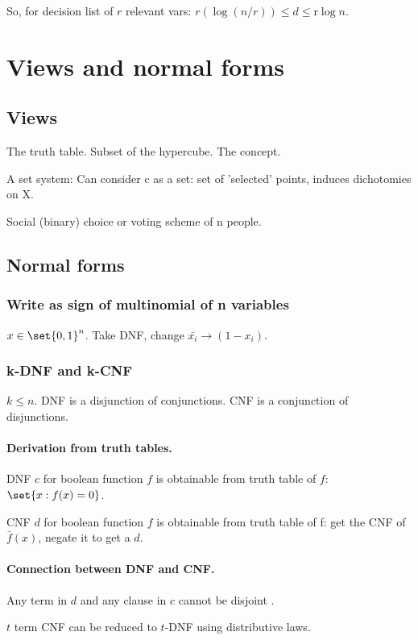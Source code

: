 \documentclass[oneside, article]{memoir}
\begin{document}
So, for decision list of $r$ relevant vars: $r(\log (n/r))\leq d \leq $r$ \log n$.

\chapter{Views and normal forms}
\section{Views}
The truth table. Subset of the hypercube. The concept.

A set system: Can consider c as a set: set of 'selected' points, induces dichotomies on X.

Social (binary) choice or voting scheme of n people.

\section{Normal forms}
\subsection{Write as sign of multinomial of n variables}
$x \in \set{0, 1}^{n}$. Take DNF, change $\bar{x_{i}} \to (1-x_{i})$.

\subsection{k-DNF and k-CNF}
$k \leq n$. DNF is a disjunction of conjunctions. CNF is a conjunction of disjunctions.

\subsubsection{Derivation from truth tables.}
DNF $c$ for boolean function $f$ is obtainable from truth table of $f$: \\$\set{x: f(x) = 0}$.

CNF $d$ for boolean function $f$ is obtainable from truth table of f: get the CNF of $\bar{f}(x)$, negate it to get a $d$.

\subsubsection{Connection between DNF and CNF.}
Any term in $d$ and any clause in $c$ cannot be disjoint \why.

$t$ term CNF can be reduced to $t$-DNF using distributive laws.
\end{document}
